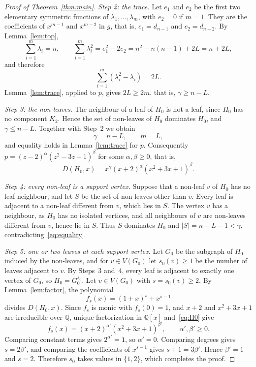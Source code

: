 \documentclass{amsart}
\theoremstyle{definition}
\theoremstyle{remark}
\numberwithin{equation}{section}
\newcommand{\Q}{\mathbb{Q}}
\begin{document}
\begin{proof}[Proof of Theorem~\ref{thm:main}]
\emph{Step 2: the trace.} Let $e_1$ and $e_2$ be the first two elementary symmetric functions of $\lambda_1,\dots,\lambda_m$, with $e_2=0$ if $m=1$. They are the coefficients of $x^{m-1}$ and $x^{m-2}$ in $g$, that is, $e_1=d_{n-1}$ and $e_2=d_{n-2}$. By Lemma~\ref{lem:top},
\[
\sum_{i=1}^m\lambda_i=n,\qquad \sum_{i=1}^m\lambda_i^2=e_1^2-2e_2=n^2-n(n-1)+2L=n+2L,
\]
and therefore
\begin{equation}\label{eq:2L}
\sum_{i=1}^m(\lambda_i^2-\lambda_i)=2L.
\end{equation}
Lemma~\ref{lem:trace}, applied to $p$, gives $2L\ge 2m$, that is, $\gamma\ge n-L$.

\emph{Step 3: the non-leaves.} The neighbour of a leaf of $H_0$ is not a leaf, since $H_0$ has no component $K_2$. Hence the set of non-leaves of $H_0$ dominates $H_0$, and $\gamma\le n-L$. Together with Step~2 we obtain
\begin{equation}\label{eq:equality}
\gamma=n-L,\qquad m=L,
\end{equation}
and equality holds in Lemma~\ref{lem:trace} for $p$. Consequently $p=(z-2)^\alpha(z^2-3z+1)^\beta$ for some $\alpha,\beta\ge0$, that is,
\begin{equation}\label{eq:H0}
D(H_0,x)=x^\gamma(x+2)^\alpha(x^2+3x+1)^\beta.
\end{equation}

\emph{Step 4: every non-leaf is a support vertex.} Suppose that a non-leaf $v$ of $H_0$ has no leaf neighbour, and let $S$ be the set of non-leaves other than $v$. Every leaf is adjacent to a non-leaf different from $v$, which lies in $S$. The vertex $v$ has a neighbour, as $H_0$ has no isolated vertices, and all neighbours of $v$ are non-leaves different from $v$, hence lie in $S$. Thus $S$ dominates $H_0$ and $|S|=n-L-1<\gamma$, contradicting~\eqref{eq:equality}.

\emph{Step 5: one or two leaves at each support vertex.} Let $G_0$ be the subgraph of $H_0$ induced by the non-leaves, and for $v\in V(G_0)$ let $s_0(v)\ge1$ be the number of leaves adjacent to $v$. By Steps~3 and~4, every leaf is adjacent to exactly one vertex of $G_0$, so $H_0=G_0^{s_0}$. Let $v\in V(G_0)$ with $s=s_0(v)\ge2$. By Lemma~\ref{lem:factor}, the polynomial
\[
f_s(x)=(1+x)^s+x^{s-1}
\]
divides $D(H_0,x)$. Since $f_s$ is monic with $f_s(0)=1$, and $x+2$ and $x^2+3x+1$ are irreducible over $\Q$, unique factorization in $\Q[x]$ and~\eqref{eq:H0} give
\[
f_s(x)=(x+2)^{\alpha'}(x^2+3x+1)^{\beta'},\qquad \alpha',\beta'\ge0.
\] Comparing constant terms gives $2^{\alpha'}=1$, so $\alpha'=0$. Comparing degrees gives $s=2\beta'$, and comparing the coefficients of $x^{s-1}$ gives $s+1=3\beta'$. Hence $\beta'=1$ and $s=2$. Therefore $s_0$ takes values in $\{1,2\}$, which completes the proof.
\end{proof}
\end{document}

